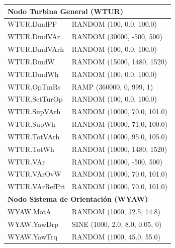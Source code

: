 \begin{longtable}{@{}p{7cm}p{7cm}@{}}
\midrule
\multicolumn{2}{l}{\textbf{Nodo Turbina General (WTUR)}} \\
\midrule
WTUR.DmdPF & RANDOM (100, 0.0, 100.0) \\
WTUR.DmdVAr & RANDOM (30000, -500, 500) \\
WTUR.DmdVArh & RANDOM (100, 0.0, 100.0) \\
WTUR.DmdW & RANDOM (15000, 1480, 1520) \\
WTUR.DmdWh & RANDOM (100, 0.0, 100.0) \\
WTUR.OpTmRs & RAMP (360000, 0, 999, 1) \\
WTUR.SetTurOp & RANDOM (100, 0.0, 100.0) \\
WTUR.SupVArh & RANDOM (10000, 70.0, 101.0) \\
WTUR.SupWh & RANDOM (10000, 71.0, 100.0) \\
WTUR.TotVArh & RANDOM (10000, 95.0, 105.0) \\
WTUR.TotWh & RANDOM (10000, 1480, 1520) \\
WTUR.VAr & RANDOM (10000, -500, 500) \\
WTUR.VArOvW & RANDOM (10000, 70.0, 101.0) \\
WTUR.VArRefPri & RANDOM (10000, 70.0, 101.0) \\

\midrule
\multicolumn{2}{l}{\textbf{Nodo Sistema de Orientación (WYAW)}} \\
\midrule
WYAW.MotA & RANDOM (1000, 12.5, 14.8) \\
WYAW.YawDrp & SINE (1000, 2.0, 8.0, 0.05, 0) \\
WYAW.YawTrq & RANDOM (1000, 45.0, 55.0) \\

\end{longtable}
